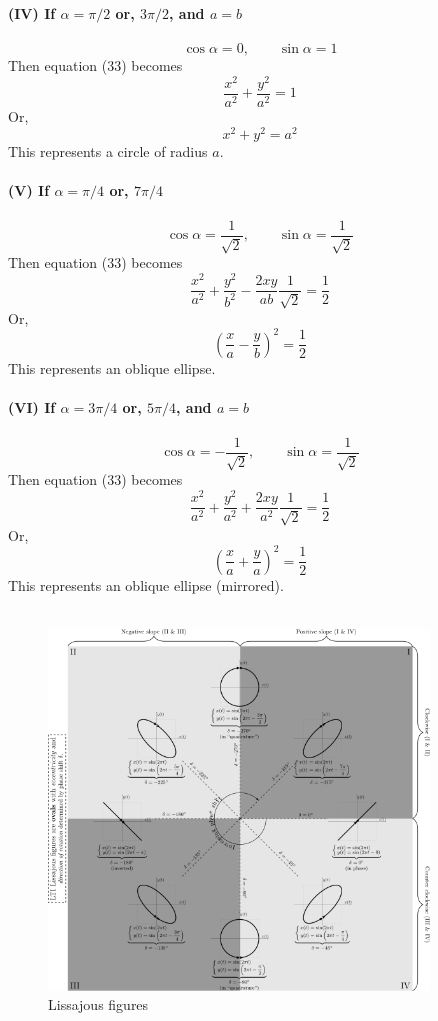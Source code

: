 \documentclass[12pt]{article}
\begin{document}
\textbf{(IV) If $\alpha=\pi/2$ or, $3\pi/2$, and $a=b$}\\~\\
\[ \cos{\alpha} = 0, \qquad \sin{\alpha} = 1 \]
Then equation (33) becomes \[
    \frac{x^2}{a^2} + \frac{y^2}{a^2} = 1
\]
Or, \[
    x^2 + y^2 = a^2
\]
This represents a circle of radius $a$.\\~\\

\textbf{(V) If $\alpha=\pi/4$ or, $7\pi/4$}\\~\\
\[ \cos{\alpha} = \frac{1}{\sqrt{2}}, \qquad \sin{\alpha} = \frac{1}{\sqrt{2}} \]
Then equation (33) becomes \[
    \frac{x^2}{a^2} + \frac{y^2}{b^2} - \frac{2xy}{ab} \frac{1}{\sqrt{2}} = \frac{1}{2}
\]
Or, \[
    \left( \frac{x}{a} - \frac{y}{b} \right)^2 = \frac{1}{2}
\]
This represents an oblique ellipse.\\~\\

\textbf{(VI) If $\alpha=3\pi/4$ or, $5\pi/4$, and $a=b$}\\~\\
\[ \cos{\alpha} = -\frac{1}{\sqrt{2}}, \qquad \sin{\alpha} = \frac{1}{\sqrt{2}} \]
Then equation (33) becomes \[
    \frac{x^2}{a^2} + \frac{y^2}{a^2} + \frac{2xy}{a^2} \frac{1}{\sqrt{2}} = \frac{1}{2}
\]
Or, \[
    \left( \frac{x}{a} + \frac{y}{a} \right)^2 = \frac{1}{2}
\]
This represents an oblique ellipse (mirrored).\\~\\

\begin{figure}[htpb]
    \centering
    \includegraphics[width=0.9\textwidth]{Lissajous.png}
    \caption{Lissajous figures}
    \label{fig:Lissajous-png}
\end{figure}
\end{document}
